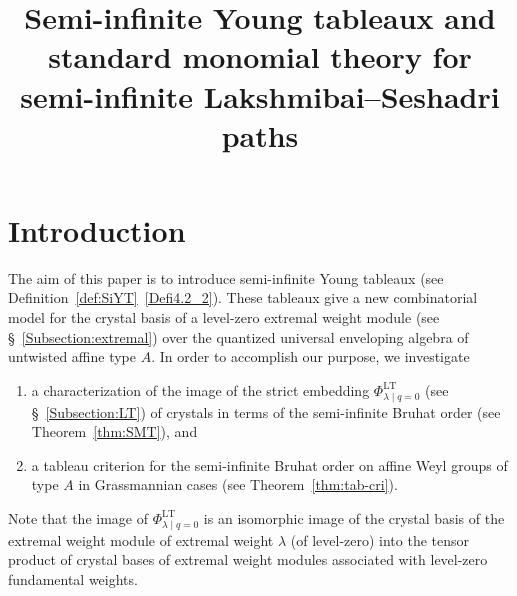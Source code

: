 \documentclass[ALCO,ThmDefs,Unicode,epreuves]{cedram}
\author{\firstname{Motohiro} \lastname{Ishii}}
\title
[Semi-infinite Young tableaux]
{Semi-infinite Young tableaux and standard monomial theory for semi-infinite Lakshmibai--Seshadri paths}
\DeclareMathOperator{\LT}{LT}
\begin{document}
\maketitle

\section{Introduction}

The aim of this paper is to introduce semi-infinite Young tableaux
(see Definition~\ref{def:SiYT}~\ref{Defi4.2_2}). 
These tableaux give a new combinatorial model for 
the crystal basis of a level-zero extremal weight module 
(see \S~\ref{Subsection:extremal})
over the quantized universal enveloping algebra of untwisted affine type $A$. 
In order to accomplish our purpose, we investigate 
\begin{enumerate}[label=(\roman*)]
\item
a characterization of 
the image of the strict embedding 
$\Phi_{\lambda \mid q=0}^{\LT }$ (see \S~\ref{Subsection:LT})
of crystals in terms of the semi-infinite Bruhat order 
(see Theorem~\ref{thm:SMT}), and 
\item
a tableau criterion for the semi-infinite Bruhat order on 
affine Weyl groups of type $A$ in Grassmannian cases (see Theorem~\ref{thm:tab-cri}).
\end{enumerate}
Note that the image of 
$\Phi_{\lambda \mid q=0}^{\LT }$
is an isomorphic image of the crystal basis of 
the extremal weight module of extremal weight $\lambda$ (of level-zero) 
into the tensor product of crystal bases of extremal weight modules 
associated with level-zero fundamental weights. 
\end{document}
